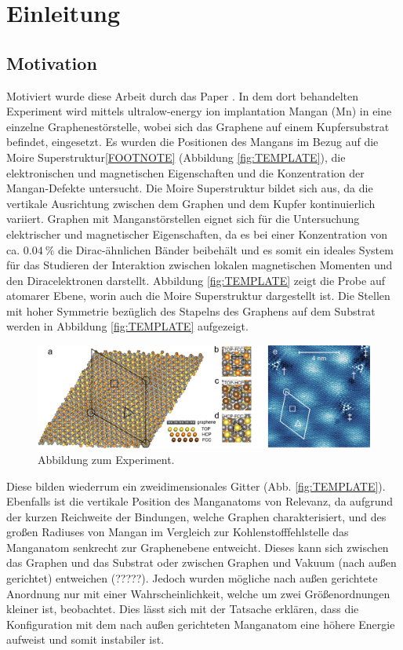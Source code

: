 \chapter{Einleitung}
\section{Motivation}
Motiviert wurde diese Arbeit durch das Paper \cite{doi:10.1021/acsnano.1c00139}.
In dem dort behandelten Experiment wird mittels ultralow-energy ion implantation Mangan (Mn) in eine einzelne Graphenestörstelle, wobei sich das Graphene auf einem Kupfersubstrat befindet, eingesetzt.
Es wurden die Positionen des Mangans im Bezug auf die Moire Superstruktur\ref{FOOTNOTE} (Abbildung \ref{fig:TEMPLATE}), die elektronischen und magnetischen Eigenschaften und die Konzentration der Mangan-Defekte
untersucht.
Die Moire Superstruktur bildet sich aus, da die vertikale Ausrichtung zwischen dem Graphen und dem Kupfer kontinuierlich variiert.
Graphen mit Manganstörstellen eignet sich für die Untersuchung elektrischer und magnetischer Eigenschaften, da es bei einer Konzentration von ca. $\qty{0.04}{\percent}$ 
die Dirac-ähnlichen Bänder beibehält und es somit ein ideales System für das Studieren der Interaktion
zwischen lokalen magnetischen Momenten und den Diracelektronen darstellt.
Abbildung \ref{fig:TEMPLATE} zeigt die Probe auf atomarer Ebene, worin auch die Moire Superstruktur dargestellt ist.
Die Stellen mit hoher Symmetrie bezüglich des Stapelns des Graphens auf dem Substrat werden in 
Abbildung \ref{fig:TEMPLATE} aufgezeigt.
\begin{figure}
    \centering
    \includegraphics[width = \textwidth]{Plots/images_large_nn1c00139_0002.jpeg}
    \caption{Abbildung zum Experiment.}
    \label{fig:ascnano}
\end{figure}
Diese bilden wiederrum ein zweidimensionales Gitter (Abb. \ref{fig:TEMPLATE}).
Ebenfalls ist die vertikale Position des Manganatoms von Relevanz, da aufgrund der kurzen Reichweite der Bindungen,
welche Graphen charakterisiert, und des großen Radiuses von Mangan im Vergleich zur Kohlenstofffehlstelle das Manganatom senkrecht zur Graphenebene
entweicht.
Dieses kann sich zwischen das Graphen und das Substrat oder zwischen Graphen und Vakuum (nach außen gerichtet) entweichen (?????). 
Jedoch wurden mögliche nach außen gerichtete Anordnung nur mit einer Wahrscheinlichkeit, 
welche um zwei Größenordnungen kleiner ist, beobachtet.
Dies lässt sich mit der Tatsache erklären, dass die Konfiguration mit dem nach außen gerichteten Manganatom
eine höhere Energie aufweist und somit instabiler ist.
